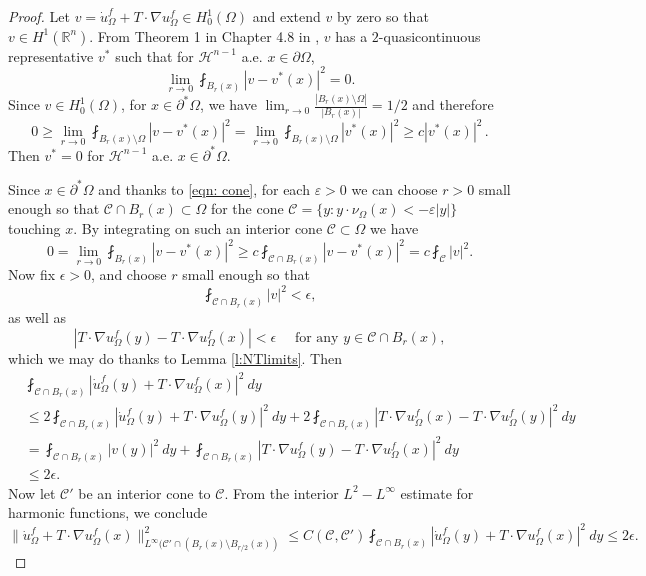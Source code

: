\documentclass[10pt, reqno]{amsart}
\numberwithin{equation}{section}
\def\e{\varepsilon}
\def\W{\Omega}
\def\na{\nabla}
\begin{document}
\begin{proof}
Let $v=\dot{u}_{\W}^f + T \cdot \nabla u_{\W}^f \in H_0^1(\Omega)$ and extend $v$ by zero so that $ v \in H^1(\mathbb{R}^n)$.
 From Theorem 1 in Chapter 4.8 in \cite{eg15}, 
$v$ has a $2$-quasicontinuous representative $v^*$ such that for $\mathcal{H}^{n-1}$ a.e. $x \in \partial \W$, 
\[
 \lim_{r \to 0}  \fint_{B_r(x)} |v-v^*(x)|^2=0. 
\]
Since $v \in H_0^1(\W)$, for $x \in \partial^* \W$, we have $\lim_{r\to 0} \frac{|B_r(x)\setminus \W|}{|B_r(x)|} = 1/2$ and therefore 
\[
0\geq \lim_{r \to 0}  \fint_{B_r(x)\setminus\W} |v-v^*(x)|^2
= \lim_{r \to 0} \fint_{B_r(x)\setminus \W} |v^*(x)|^2
\geq c |v^*(x)|^2\,.
\]
Then $v^*=0$ for $\mathcal{H}^{n-1}$ a.e. $x \in \partial^* \W$. 

%

Since $x\in \partial^*\W$ and thanks to \eqref{eqn: cone}, for each $\e>0$ we can choose $r>0$ small enough so that $\mathcal{C} \cap  B_r(x) \subset \W$ for the cone $\mathcal{C} = \{ y : y \cdot \nu_\W(x)<-\e|y|\}$  touching $x$.
By integrating on such an interior cone $\mathcal{C} \subset \W$ we have 
\[
0 = \lim_{r \to 0}\fint_{B_r(x)} |v-v^*(x)|^2 \geq c \fint_{\mathcal{C}\cap B_r(x)} |v-v^*(x)|^2=c\fint_{\mathcal{C}} |v|^2 . 
\]
Now fix $\epsilon >0$, and choose $r$ small enough so that 
\[
\fint_{\mathcal{C}\cap B_r(x)} |v|^2 < \epsilon, 
\]
as well as 
\[
|  T \cdot \nabla u_{\W}^f (y) -  T\cdot \nabla u_{\W}^f(x) |  < \epsilon \quad \text{ for any } y \in \mathcal{C} \cap B_{r}(x),
\]
which we may do thanks to Lemma \ref{l:NTlimits}. Then 
\[
\begin{aligned}
&\fint_{\mathcal{C}\cap B_{r}(x)} |\dot{u}_{\W}^f(y) +T\cdot \nabla u_{\W}^f(x)|^2 \ dy \\
&\leq 
2\fint_{\mathcal{C}\cap B_r(x)} |\dot{u}_{\W}^f(y)+T\cdot \nabla u_{\W}^f(y)|^2 \ dy
+2 \fint_{\mathcal{C}\cap B_r(x)} |T\cdot \nabla u_{\W}^f(x)-T\cdot\nabla  u_{\W}^f(y)|^2 \ dy\\
&= \fint_{\mathcal{C}\cap B_r(x)} |v(y)|^2 \ dy + \fint_{\mathcal{C}\cap B_r(x)} |T\cdot \na u_{\W}^f(y)-T\cdot \na u_{\W}^f(x)|^2 \ dy\\
&\leq 2 \epsilon.
\end{aligned}
\]
Now let $\mathcal{C}'$ be an interior cone to $\mathcal{C}$. From the interior $L^2-L^{\infty}$ estimate for harmonic functions, we conclude 
\begin{equation}
    \label{eqn uniform bound}
\| \dot{u}_{\W}^f + T \cdot\na u_{\W}^f(x) \|^2_{L^{\infty}(\mathcal{C'}\cap (B_r(x)\setminus B_{r/2}(x))} \leq C(\mathcal{C},\mathcal{C}')\fint_{\mathcal{C}\cap B_r(x)} |\dot{u}_{\W}^f(y) +T\cdot \na u_{\W}^f(x)|^2 \ dy \leq 2 \epsilon. 

\end{equation}
\end{proof}
\end{document}

